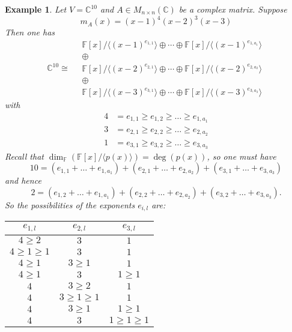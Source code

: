 \documentclass[12pt]{amsbook}
\newtheorem{example}[theorem]{Example}
\begin{document}
\begin{example}
    Let $V = \mathbb{C}^{10}$ and $A \in M_{n \times n}(\mathbb{C})$ be a complex matrix. Suppose
    $$m_{A}(x) = (x-1)^4(x-2)^3(x-3)$$
    Then one has 
    $$\mathbb{C}^{10} \cong \quad \begin{matrix} \mathbb{F}[x]/\langle (x-1)^{e_{1,1}} \rangle \oplus  \cdots \oplus \mathbb{F}[x]/\langle (x-1)^{e_{1,a_1}} \rangle \\
    \oplus \\ 
    \mathbb{F}[x]/\langle (x-2)^{e_{2,1}} \rangle \oplus \cdots \oplus \mathbb{F}[x]/\langle (x-2)^{e_{2,a_2}} \rangle\\ \oplus \\ 
    \mathbb{F}[x]/\langle (x-3)^{e_{3,1}} \rangle \oplus \cdots \oplus \mathbb{F}[x]/\langle (x-3)^{e_{3,a_3}}\rangle \end{matrix}$$
    with
    \begin{align*}
    4 &= e_{1,1} \geq e_{1,2} \geq \dots \geq e_{1,a_1}\\
    3 &= e_{2,1} \geq e_{2,2} \geq \dots \geq e_{2,a_2}\\
    1 &= e_{3,1} \geq e_{3,2} \geq \dots \geq e_{3,a_3}
    \end{align*}
    Recall that $\dim_{\mathbb{F}}(\mathbb{F}[x]/\langle p(x) \rangle) = \deg(p(x))$, so one must have
    $$10 = (e_{1,1} + \dots + e_{1,a_1})+ (e_{2,1} + \dots + e_{2,a_2}) + (e_{3,1} + \dots + e_{3,a_3})$$
    and hence
    $$2 = (e_{1,2} + \dots + e_{1,a_1})+ (e_{2,2} + \dots + e_{2,a_2}) + (e_{3,2} + \dots + e_{3,a_3}).$$
    So the possibilities of the exponents $e_{i,l}$ are:
    \begin{center}
    \begin{tabular}{|c|c|c|}
        \hline 
        $e_{1,l}$ &  $e_{2,l}$ & $e_{3,l}$\\
        \hline
         $4 \geq 2$ & $3$ & $1$\\
         \hline
         $4 \geq 1 \geq 1$ & $3$ & $1$\\
         \hline
         $4 \geq 1$ & $3 \geq 1$ & $1$\\
         \hline
         $4 \geq 1$ & $3$ & $1 \geq 1$\\
         \hline
         $4$ & $3 \geq 2$ & $1$\\
         \hline
         $4$ & $3 \geq 1 \geq 1$ & $1$\\
         \hline
         $4$ & $3 \geq 1$ & $1 \geq 1$\\
         \hline
         $4$ & $3$ & $1 \geq 1 \geq 1$\\
         \hline
    \end{tabular}    
    \end{center}


\end{example}
\end{document}
